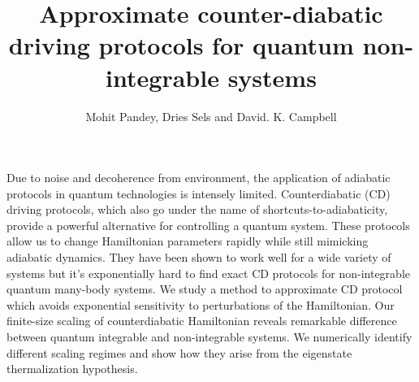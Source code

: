 \documentclass[11pt,a4paper]{article}
\author{Mohit Pandey, Dries Sels and David. K. Campbell}
\title{Approximate counter-diabatic driving protocols for quantum non-integrable systems  }
\begin{document}
\maketitle


Due to noise and decoherence from environment, the application of adiabatic protocols in quantum technologies is intensely limited. Counterdiabatic (CD) driving protocols, which also go under the name of shortcuts-to-adiabaticity, provide a powerful alternative for controlling a quantum system. These protocols allow us to change Hamiltonian parameters rapidly while still mimicking adiabatic dynamics. They have been shown to work well for a wide variety of systems but it's exponentially hard to find exact CD protocols for non-integrable quantum many-body systems. We study a method to approximate CD protocol which avoids exponential sensitivity to perturbations of the Hamiltonian. Our finite-size scaling of counterdiabatic Hamiltonian reveals remarkable difference between quantum integrable and non-integrable systems. We numerically identify different scaling regimes and show how they arise from the eigenstate thermalization hypothesis.  
\end{document}
